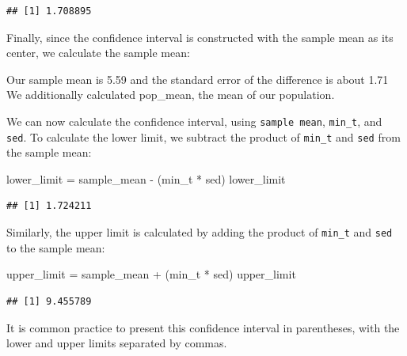 \documentclass[
]{book}
\newenvironment{Shaded}{\begin{snugshade}}{\end{snugshade}}
\newcommand{\FunctionTok}[1]{\textcolor[rgb]{0.00,0.00,0.00}{#1}}
\newcommand{\NormalTok}[1]{#1}
\newcommand{\OtherTok}[1]{\textcolor[rgb]{0.56,0.35,0.01}{#1}}
\newcommand{\SpecialCharTok}[1]{\textcolor[rgb]{0.00,0.00,0.00}{#1}}
\begin{document}
\begin{verbatim}
## [1] 1.708895
\end{verbatim}

Finally, since the confidence interval is constructed with the sample
mean as its center, we calculate the sample mean:

\begin{Shaded}
\end{Shaded}

Our sample mean is 5.59 and the standard error of the difference is
about 1.71 We additionally calculated pop\_mean, the mean of our
population.

We can now calculate the confidence interval, using \texttt{sample\ mean},
\texttt{min\_t}, and \texttt{sed}. To calculate the lower limit, we subtract the
product of \texttt{min\_t} and \texttt{sed} from the sample mean:

\begin{Shaded}
\begin{Highlighting}[]
\NormalTok{lower\_limit }\OtherTok{=}\NormalTok{ sample\_mean }\SpecialCharTok{{-}}\NormalTok{ (min\_t }\SpecialCharTok{*}\NormalTok{ sed)}
\NormalTok{lower\_limit}
\end{Highlighting}
\end{Shaded}

\begin{verbatim}
## [1] 1.724211
\end{verbatim}

Similarly, the upper limit is calculated by adding the product of
\texttt{min\_t} and \texttt{sed} to the sample mean:

\begin{Shaded}
\begin{Highlighting}[]
\NormalTok{upper\_limit }\OtherTok{=}\NormalTok{ sample\_mean }\SpecialCharTok{+}\NormalTok{ (min\_t }\SpecialCharTok{*}\NormalTok{ sed)}
\NormalTok{upper\_limit}
\end{Highlighting}
\end{Shaded}

\begin{verbatim}
## [1] 9.455789
\end{verbatim}

It is common practice to present this confidence interval in
parentheses, with the lower and upper limits separated by commas.
\end{document}
